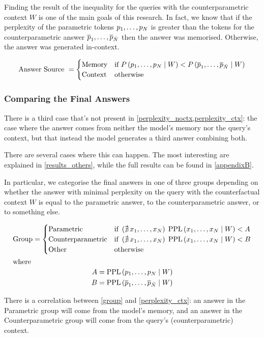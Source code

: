 Finding the result of the inequality for the queries with the counterparametric context $W$ is one of the main goals of this research.
In fact, we know that if the perplexity of the parametric tokens $p_1, \dots, p_N$ is greater than the tokens for the counterparametric answer $\overline{p}_1, \dots, \overline{p}_{\bar{N}}$ then the answer was memorised.
Otherwise, the answer was generated in-context.

\begin{equation}
	\text{Answer Source } =
	\begin{cases}
		\text{Memory} & \text{if } P \left( p_1, \dots, p_N \mid W \right) < P \left( \overline{p}_1, \dots, \overline{p}_{\bar{N}} \mid W \right) \\
		\text{Context} & \text{otherwise}
	\end{cases}
	\label{perplexity_ctx}
\end{equation}

\vfill{}

\subsubsection{Comparing the Final Answers}

There is a third case that's not present in \cref{perplexity_noctx,perplexity_ctx}: the case where the answer comes from neither the model's memory nor the query's context, but that instead the model generates a third answer combining both.

There are several cases where this can happen.
The most interesting are explained in \cref{results_others}, while the full results can be found in \cref{appendixB}.

In particular, we categorise the final answers in one of three groups depending on whether the answer with minimal perplexity on the query with the counterfactual context $W$ is equal to the parametric answer, to the counterparametric answer, or to something else.

\begin{gather}
	\text{Group} =
	\begin{cases}
		\text{Parametric} & \text{if } \left( \nexists \, x_1, \dots, x_N \right) \; \text{PPL} \left( x_1, \dots, x_N \mid W \right) < A \\
		\text{Counterparametric} & \text{if } \left( \nexists \, x_1, \dots, x_N \right) \; \text{PPL} \left( x_1, \dots, x_N \mid W \right) < B \\
		\text{Other} & \text{otherwise}
	\end{cases} \label{group} \\
	\intertext{where}
	\begin{aligned}
		A = \text{PPL} \left( p_1, \dots, p_N \mid W \right) \\
		B = \text{PPL} \left( \overline{p}_1, \dots, \overline{p}_{\bar{N}} \mid W \right)
	\end{aligned} \notag{}
\end{gather}

There is a correlation between \cref{group} and \cref{perplexity_ctx}: an answer in the Parametric group will come from the model's memory, and an answer in the Counterparametric group will come from the query's (counterparametric) context.
